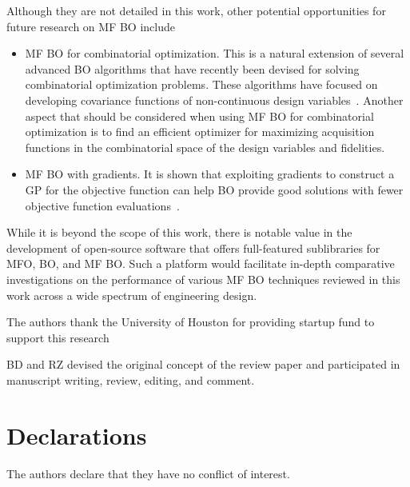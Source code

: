 \documentclass[iicol,sn-basic]{sn-jnl}%
\begin{document}
Although they are not detailed in this work, other potential opportunities for future research on MF BO include    
\begin{itemize}
	\item MF BO for combinatorial optimization. This is a natural extension of several advanced BO algorithms that have recently been devised for solving combinatorial optimization problems. These algorithms have focused on developing covariance functions of non-continuous design variables~\citep[see e.g.,][]{GomezBombarelli2018,GarridoMerchan2020,ZhangYi2020,Vangelatos2021}. Another aspect that should be considered when using MF BO for combinatorial optimization is to find an efficient optimizer for maximizing acquisition functions in the combinatorial space of the design variables and fidelities.
	
	\item MF BO with gradients. It is shown that exploiting gradients to construct a GP for the objective function can help BO provide good solutions with fewer objective function evaluations~\citep{WuJ2017}.
\end{itemize}

While it is beyond the scope of this work, there is notable value in the development of open-source software that offers full-featured sublibraries for MFO, BO, and MF BO.
Such a platform would facilitate in-depth comparative investigations on the performance of various MF BO techniques reviewed in this work across a wide spectrum of engineering design.

The authors thank the University of Houston for providing startup fund
to support this research

BD and RZ devised the original concept of the review paper and participated in manuscript writing, review, editing, and comment.

\section*{Declarations}
The authors declare that they have no conflict of interest.
\end{document}
